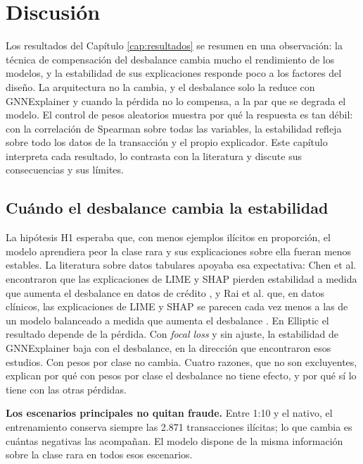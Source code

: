 \chapter{Discusión}\label{cap:discusion}

Los resultados del Capítulo \ref{cap:resultados} se resumen en una observación: la técnica de
compensación del desbalance cambia mucho el rendimiento de los modelos, y la estabilidad de sus
explicaciones responde poco a los factores del diseño. La arquitectura no la cambia, y el
desbalance solo la reduce con GNNExplainer y cuando la pérdida no lo compensa, a la par que se
degrada el modelo. El control de pesos aleatorios muestra por qué la respuesta es tan débil: con
la correlación de Spearman sobre todas las variables, la estabilidad refleja sobre todo los datos
de la transacción y el propio explicador. Este capítulo interpreta cada resultado, lo contrasta con la literatura y discute
sus consecuencias y sus límites.

\section{Cuándo el desbalance cambia la estabilidad}\label{sec:dis_h1}

La hipótesis H1 esperaba que, con menos ejemplos ilícitos en proporción, el modelo aprendiera
peor la clase rara y sus explicaciones sobre ella fueran menos estables. La literatura sobre
datos tabulares apoyaba esa expectativa: Chen et al. encontraron que las explicaciones de LIME y
SHAP pierden estabilidad a medida que aumenta el desbalance en datos de crédito
\cite{Chen2023CreditImbalance}, y Rai et al. que, en datos clínicos, las explicaciones de LIME y
SHAP se parecen cada vez menos a las de un modelo balanceado a medida que aumenta el desbalance
\cite{Rai2025Evaluating}. En Elliptic el resultado depende de la pérdida. Con \textit{focal
loss} y sin ajuste, la estabilidad de GNNExplainer baja con el desbalance, en la dirección que
encontraron esos estudios. Con pesos por clase no cambia. Cuatro razones, que no son
excluyentes, explican por qué con pesos por clase el desbalance no tiene efecto, y por qué sí lo
tiene con las otras pérdidas.

\textbf{Los escenarios principales no quitan fraude.} Entre 1:10 y el nativo, el entrenamiento
conserva siempre las 2.871 transacciones ilícitas; lo que cambia es cuántas negativas las
acompañan. El modelo dispone de la misma información sobre la clase rara en todos esos
escenarios.

